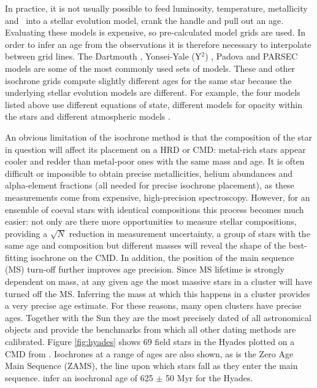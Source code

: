 In practice, it is not usually possible to feed luminosity, temperature,
metallicity and \logg\ into a stellar evolution model, crank the handle and
pull out an age.
Evaluating these models is expensive, so pre-calculated model grids are used.
In order to infer an age from the observations it is therefore necessary to
interpolate between grid lines.
The Dartmouth \citep{Dotter2008}, Yonsei-Yale (Y$^2$) \citep{Yi2001,
Spada2013}, Padova \citep{Girardi2002} and PARSEC \citep{Bressan2012} models
are some of the most commonly used sets of models.
These and other isochrone grids compute slightly different ages for the same
star because the underlying stellar evolution models are different.
For example, the four models listed above use different equations of state,
different models for opacity within the stars and different atmospheric
models \citep[see][for a comparison of these four sets of
isochrones]{Thompson2014}.

An obvious limitation of the isochrone method is that the composition of the
star in question will affect its placement on a HRD or CMD: metal-rich stars
appear cooler and redder than metal-poor ones with the same mass and age.
It is often difficult or impossible to obtain precise metallicities, helium
abundances and alpha-element fractions (all needed for precise isochrone
placement), as these measurements come from expensive, high-precision
spectroscopy.
However, for an ensemble of coeval stars with identical compositions this
process becomes much easier: not only are there more opportunities to measure
stellar compositions, providing a $\sqrt N$ reduction in measurement
uncertainty, a group of stars with the same age and composition but different
masses will reveal the shape of the best-fitting isochrone on the CMD\@.
In addition, the position of the main sequence (MS) turn-off further improves
age precision.
Since MS lifetime is strongly dependent on mass, at any given age the most
massive stars in a cluster will have turned off the MS.
Inferring the mass at which this happens in a cluster provides a very precise
age estimate.
For these reasons, many open clusters have precise ages.
Together with the Sun they are the most precisely dated of all astronomical
objects and provide the benchmarks from which all other dating methods are
calibrated.
Figure \ref{fig:hyades} shows 69 field stars in the Hyades plotted on a CMD
from \citet{Perryman1998}.
Isochrones at a range of ages are also shown, as is the Zero Age Main Sequence
(ZAMS), the line upon which stars fall as they enter the main sequence.
\citet{Perryman1998} infer an isochronal age of 625 $\pm$ 50 Myr for the
Hyades.

